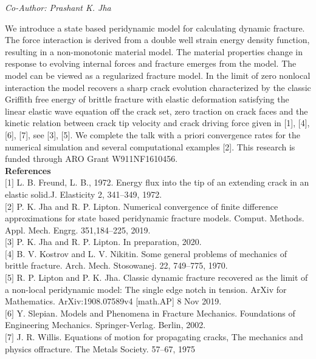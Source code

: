 \begin{center}
\textit{Co-Author: Prashant K. Jha}
\end{center} 
We introduce a state based peridynamic model for calculating dynamic fracture. The force interaction is derived from a double well strain energy density function, resulting in a non-monotonic material model. The material properties change in response to evolving internal forces and fracture emerges from the model. The model can be viewed as a regularized fracture model.  In the limit of zero nonlocal interaction the model recovers a sharp crack evolution characterized by the classic Griffith free energy of brittle fracture with elastic deformation satisfying the linear elastic wave equation off the crack set, zero traction on crack faces and the kinetic relation between crack tip velocity and crack driving force given in [1], [4], [6], [7], see [3], [5]. We complete the talk with a priori convergence rates for the numerical simulation and several computational examples [2]. This research is funded through ARO Grant W911NF1610456.\\

\noindent\textbf{References}\\
$[$1$]$ L. B. Freund, L. B., 1972. Energy flux into the tip of an extending crack in an elastic solid.J. Elasticity 2, 341–349, 1972. \\\newline
$[$2$]$ P. K. Jha and R. P. Lipton. Numerical convergence of finite difference approximations for state based peridynamic fracture models.  Comput. Methods. Appl. Mech. Engrg. 351,184–225, 2019. \\\newline
$[$3$]$ P. K. Jha and R. P. Lipton. In preparation, 2020.\\\newline
$[$4$]$ B. V. Kostrov and L. V. Nikitin. Some general problems of mechanics of brittle fracture.  Arch. Mech. Stosowanej. 22, 749–775, 1970.\\\newline
$[$5$]$ R. P. Lipton and P. K. Jha. Classic dynamic fracture recovered as the limit of a non-local peridynamic model: The single edge notch in tension. ArXiv for Mathematics.  ArXiv:1908.07589v4 [math.AP] 8 Nov 2019.\\\newline
$[$6$]$ Y. Slepian. Models and Phenomena in Fracture Mechanics. Foundations of Engineering Mechanics. Springer-Verlag. Berlin, 2002. \\\newline
$[$7$]$ J. R. Willis. Equations of motion for propagating cracks, The mechanics and physics offracture.  The Metals Society. 57–67, 1975
